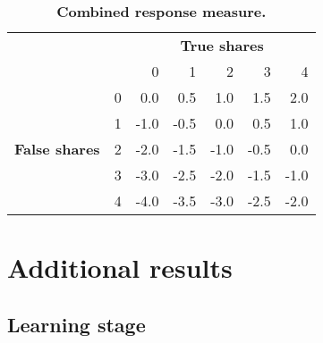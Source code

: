 \documentclass[letterpaper, 12pt, parskip=full,DIV=10]{scrartcl}
\begin{document}
\begin{table}[!ht]
\centering
\begin{tabular}{lrrrrrr}
                                   & & \multicolumn{5}{c}{\textbf{True shares}}     \\ 
                                   & & 0                    & 1                    & 2                                 & 3                    & \multicolumn{1}{r}{4}    \\  \cmidrule(lr){3-7}
\multicolumn{1}{l}{}              & \multicolumn{1}{r}{0} & 0.0                  & 0.5                  & 1.0                               & 1.5                  & \multicolumn{1}{r}{2.0}  \\
\multicolumn{1}{l}{}              & \multicolumn{1}{r}{1} & -1.0                 & -0.5                 & 0.0                               & 0.5                  & \multicolumn{1}{r}{1.0}  \\
\multicolumn{1}{l}{\textbf{False shares}} & \multicolumn{1}{r}{2} & -2.0                 & -1.5                 & -1.0                              & -0.5                 & \multicolumn{1}{r}{0.0}  \\
\multicolumn{1}{l}{}              & \multicolumn{1}{r}{3} & -3.0                 & -2.5                 & -2.0                              & -1.5                 & \multicolumn{1}{r}{-1.0} \\
\multicolumn{1}{l}{}              & \multicolumn{1}{r}{4} & -4.0                 & -3.5                 & -3.0                              & -2.5                 & \multicolumn{1}{r}{-2.0} \\ 
\end{tabular}
\caption{\textbf{Combined response measure.}}
\label{tab:response_fun}
\end{table}

\section{Additional results}
\subsection{Learning stage}\label{appendix:learning}
\end{document}
